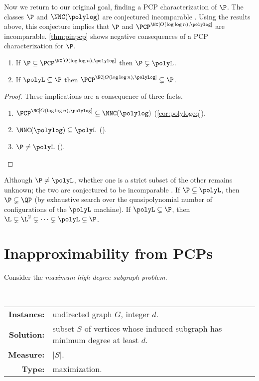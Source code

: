 \documentclass{article}
\newcommand{\loglog}{\log\log}
\begin{document}
Now we return to our original goal, finding a PCP characterization of $\P$.
The classes $\P$ and $\NNC(\polylog)$ are conjectured incomparable \autocite{wolf94}.
Using the results above, this conjecture implies that $\P$ and $\PCP^\NC[O(\loglog n), \polylog]$ are incomparable.
\autoref{thm:pinpcp} shows negative consequences of a PCP characterization for $\P$.

\begin{theorem}\label{thm:pinpcp}
  \mbox{}
  \begin{enumerate}
  \item If $\P \subseteq \PCP^\NC[O(\loglog n), \polylog]$ then $\P \subsetneq \polyL$.
  \item If $\polyL \subsetneq \P$ then $\PCP^\NC[O(\loglog n), \polylog] \subsetneq \P$.
  \end{enumerate}
\end{theorem}
\begin{proof}
  These implications are a consequence of three facts.
  \begin{enumerate}
  \item $\PCP^\NC[O(\loglog n), \polylog] \subseteq \NNC(\polylog)$ (\autoref{cor:polylogeq}).
  \item $\NNC(\polylog) \subseteq \polyL$ (\autocite[Corollary~3.2]{wolf94}).
  \item $\P \neq \polyL$ (\autocite[Theorem~3.10]{book76}). \qedhere
  \end{enumerate}
\end{proof}

Although $\P \neq \polyL$, whether one is a strict subset of the other remains unknown; the two are conjectured to be incomparable \autocite[Section~2.5.1]{johnson90}.
If $\P \subsetneq \polyL$, then $\P \subsetneq \QP$ (by exhaustive search over the quasipolynomial number of configurations of the $\polyL$ machine).
If $\polyL \subsetneq \P$, then $\L \subsetneq \L^2 \subsetneq \dotsb \subsetneq \polyL \subsetneq \P$.

\section{Inapproximability from PCPs}

Consider the \emph{maximum high degree subgraph problem}.

\begin{definition}
  \mbox{} \\
  \begin{tabular}{r p{9.2cm}}
    \textbf{Instance:} & undirected graph $G$, integer $d$. \\
    \textbf{Solution:} & subset $S$ of vertices whose induced subgraph has minimum degree at least $d$. \\
    \textbf{Measure:} & $|S|$. \\
    \textbf{Type:} & maximization.
  \end{tabular}
\end{definition}
\end{document}
